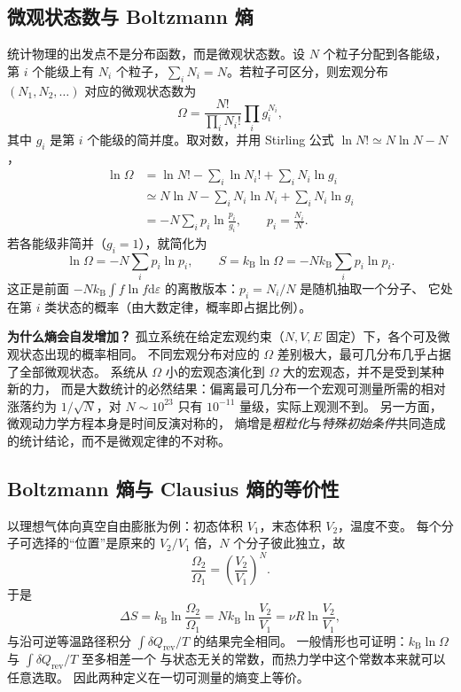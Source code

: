 \documentclass[11pt,a4paper,openany]{ctexbook}
\newcommand{\dd}{\mathrm d}
\newcommand{\kb}{k_{\mathrm B}}
\newcommand{\rev}{\mathrm{rev}}
\begin{document}
\subsection*{微观状态数与 Boltzmann 熵}
统计物理的出发点不是分布函数，而是微观状态数。设 $N$ 个粒子分配到各能级，
第 $i$ 个能级上有 $N_i$ 个粒子，$\sum_iN_i=N$。若粒子可区分，则宏观分布
$(N_1,N_2,\dots)$ 对应的微观状态数为
\[
\Omega=\frac{N!}{\prod_iN_i!}\prod_ig_i^{N_i},
\]
其中 $g_i$ 是第 $i$ 个能级的简并度。取对数，并用 Stirling 公式
$\ln N!\simeq N\ln N-N$，
\[
\begin{aligned}
\ln\Omega
&=\ln N!-\sum_i\ln N_i!+\sum_iN_i\ln g_i\\
&\simeq N\ln N-\sum_iN_i\ln N_i+\sum_iN_i\ln g_i\\
&=-N\sum_ip_i\ln\frac{p_i}{g_i},
\qquad p_i=\frac{N_i}{N}.
\end{aligned}
\]
若各能级非简并（$g_i=1$），就简化为
\[
\boxed{\ln\Omega=-N\sum_ip_i\ln p_i},
\qquad
\boxed{S=\kb\ln\Omega=-N\kb\sum_ip_i\ln p_i}.
\]
这正是前面 $-N\kb\int f\ln f\dd\varepsilon$ 的离散版本：$p_i=N_i/N$ 是随机抽取一个分子、
它处在第 $i$ 类状态的概率（由大数定律，概率即占据比例）。

\begin{notebox}
\textbf{为什么熵会自发增加？}
孤立系统在给定宏观约束（$N,V,E$ 固定）下，各个可及微观状态出现的概率相同。
不同宏观分布对应的 $\Omega$ 差别极大，最可几分布几乎占据了全部微观状态。
系统从 $\Omega$ 小的宏观态演化到 $\Omega$ 大的宏观态，并不是受到某种新的力，
而是大数统计的必然结果：偏离最可几分布一个宏观可测量所需的相对涨落约为
$1/\sqrt{N}$，对 $N\sim10^{23}$ 只有 $10^{-11}$ 量级，实际上观测不到。
另一方面，微观动力学方程本身是时间反演对称的，
熵增是\emph{粗粒化}与\emph{特殊初始条件}共同造成的统计结论，而不是微观定律的不对称。
\end{notebox}

\subsection*{Boltzmann 熵与 Clausius 熵的等价性}
以理想气体向真空自由膨胀为例：初态体积 $V_1$，末态体积 $V_2$，温度不变。
每个分子可选择的“位置”是原来的 $V_2/V_1$ 倍，$N$ 个分子彼此独立，故
\[
\frac{\Omega_2}{\Omega_1}=\left(\frac{V_2}{V_1}\right)^N .
\]
于是
\[
\Delta S=\kb\ln\frac{\Omega_2}{\Omega_1}
=N\kb\ln\frac{V_2}{V_1}
=\nu R\ln\frac{V_2}{V_1},
\]
与沿可逆等温路径积分 $\int\delta Q_{\rev}/T$ 的结果完全相同。
一般情形也可证明：$\kb\ln\Omega$ 与 $\int\delta Q_{\rev}/T$ 至多相差一个
与状态无关的常数，而热力学中这个常数本来就可以任意选取。
因此两种定义在一切可测量的熵变上等价。
\end{document}

